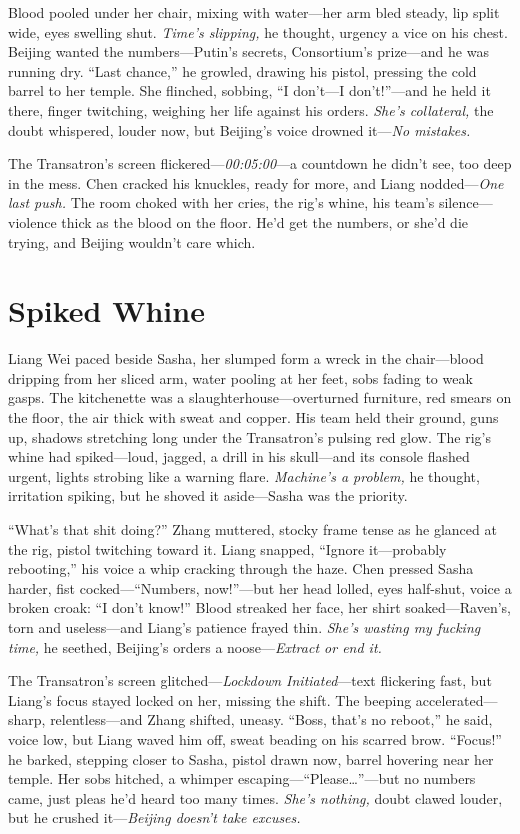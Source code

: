 \documentclass[12pt]{book}
\begin{document}
Blood pooled under her chair, mixing with water—her arm bled steady, lip split wide, eyes swelling shut. \textit{Time’s slipping,} he thought, urgency a vice on his chest. Beijing wanted the numbers—Putin’s secrets, Consortium’s prize—and he was running dry. “Last chance,” he growled, drawing his pistol, pressing the cold barrel to her temple. She flinched, sobbing, “I don’t—I don’t!”—and he held it there, finger twitching, weighing her life against his orders. \textit{She’s collateral,} the doubt whispered, louder now, but Beijing’s voice drowned it—\textit{No mistakes.}

The Transatron’s screen flickered—\textit{00:05:00}—a countdown he didn’t see, too deep in the mess. Chen cracked his knuckles, ready for more, and Liang nodded—\textit{One last push.} The room choked with her cries, the rig’s whine, his team’s silence—violence thick as the blood on the floor. He’d get the numbers, or she’d die trying, and Beijing wouldn’t care which.

\section{Spiked Whine}

Liang Wei paced beside Sasha, her slumped form a wreck in the chair—blood dripping from her sliced arm, water pooling at her feet, sobs fading to weak gasps. The kitchenette was a slaughterhouse—overturned furniture, red smears on the floor, the air thick with sweat and copper. His team held their ground, guns up, shadows stretching long under the Transatron’s pulsing red glow. The rig’s whine had spiked—loud, jagged, a drill in his skull—and its console flashed urgent, lights strobing like a warning flare. \textit{Machine’s a problem,} he thought, irritation spiking, but he shoved it aside—Sasha was the priority.

“What’s that shit doing?” Zhang muttered, stocky frame tense as he glanced at the rig, pistol twitching toward it. Liang snapped, “Ignore it—probably rebooting,” his voice a whip cracking through the haze. Chen pressed Sasha harder, fist cocked—“Numbers, now!”—but her head lolled, eyes half-shut, voice a broken croak: “I don’t know!” Blood streaked her face, her shirt soaked—Raven’s, torn and useless—and Liang’s patience frayed thin. \textit{She’s wasting my fucking time,} he seethed, Beijing’s orders a noose—\textit{Extract or end it.}

The Transatron’s screen glitched—\textit{Lockdown Initiated}—text flickering fast, but Liang’s focus stayed locked on her, missing the shift. The beeping accelerated—sharp, relentless—and Zhang shifted, uneasy. “Boss, that’s no reboot,” he said, voice low, but Liang waved him off, sweat beading on his scarred brow. “Focus!” he barked, stepping closer to Sasha, pistol drawn now, barrel hovering near her temple. Her sobs hitched, a whimper escaping—“Please…”—but no numbers came, just pleas he’d heard too many times. \textit{She’s nothing,} doubt clawed louder, but he crushed it—\textit{Beijing doesn’t take excuses.}
\end{document}
